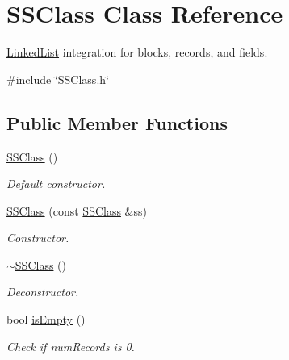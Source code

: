 \hypertarget{classSSClass}{}\section{S\+S\+Class Class Reference}
\label{classSSClass}


\hyperlink{classLinkedList}{Linked\+List} integration for blocks, records, and fields.  




{\ttfamily \#include \char`\"{}S\+S\+Class.\+h\char`\"{}}

\subsection*{Public Member Functions}
\begin{DoxyCompactItemize}
\item 
\mbox{\label{classSSClass_ab4603d6a236c4fa65f896a1158c0d2ef}} 
\hyperlink{classSSClass_ab4603d6a236c4fa65f896a1158c0d2ef}{S\+S\+Class} ()
\begin{DoxyCompactList}\small\item\em Default constructor. \end{DoxyCompactList}\item 
\mbox{\label{classSSClass_a5801614847b5403b1a5899150acd3b5c}} 
\hyperlink{classSSClass_a5801614847b5403b1a5899150acd3b5c}{S\+S\+Class} (const \hyperlink{classSSClass}{S\+S\+Class} \&ss)
\begin{DoxyCompactList}\small\item\em Constructor. \end{DoxyCompactList}\item 
\mbox{\label{classSSClass_a6e5abb04de9b90e34cc6422069ff5729}} 
\hyperlink{classSSClass_a6e5abb04de9b90e34cc6422069ff5729}{$\sim$\+S\+S\+Class} ()
\begin{DoxyCompactList}\small\item\em Deconstructor. \end{DoxyCompactList}\item 
bool \hyperlink{classSSClass_afc95611385e4d389818332414d5c491c}{is\+Empty} ()
\begin{DoxyCompactList}\small\item\em Check if num\+Records is 0. \end{DoxyCompactList}\item 

\end{DoxyCompactItemize}
